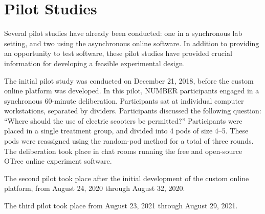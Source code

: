 \section{Pilot Studies}
Several pilot studies have already been conducted:
one in a synchronous lab setting, and two using the asynchronous online
software.
In addition to providing an opportunity to test software,
these pilot studies have provided crucial information for developing a
feasible experimental design.

The initial pilot study was conducted on December 21, 2018,
before the custom online platform was developed.
In this pilot, NUMBER participants engaged in a synchronous 60-minute deliberation.
Participants sat at individual computer workstations, separated by dividers.
Participants discussed the following question:
``Where should the use of electric scooters be permitted?''
Participants were placed in a single treatment group, and divided into 4
pods of size 4--5.
These pods were reassigned using the random-pod method for a total of three
rounds.
The deliberation took place in chat rooms running the free and open-source
OTree online experiment software.

The second pilot took place after the initial development of the custom online
platform, from August 24, 2020 through August 32, 2020.

The third pilot took place from August 23, 2021 through August 29, 2021.

